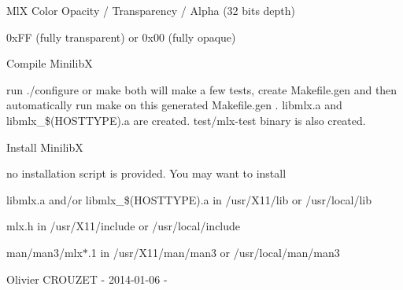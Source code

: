 \begin{DoxyCode}{0}

\end{DoxyCode}


MlX Color Opacity / Transparency / Alpha (32 bits depth)
\begin{DoxyItemize}
\item 0x\+FF (fully transparent) or 0x00 (fully opaque)
\end{DoxyItemize}

Compile MinilibX


\begin{DoxyItemize}
\item run ./configure or make both will make a few tests, create Makefile.\+gen and then automatically run make on this generated Makefile.\+gen . libmlx.\+a and libmlx\+\_\+\$(\+HOSTTYPE).a are created. test/mlx-\/test binary is also created.
\end{DoxyItemize}

Install MinilibX


\begin{DoxyItemize}
\item no installation script is provided. You may want to install
\begin{DoxyItemize}
\item libmlx.\+a and/or libmlx\+\_\+\$(\+HOSTTYPE).a in /usr/\+X11/lib or /usr/local/lib
\item mlx.\+h in /usr/\+X11/include or /usr/local/include
\item man/man3/mlx\texorpdfstring{$\ast$}{*}.1 in /usr/\+X11/man/man3 or /usr/local/man/man3
\end{DoxyItemize}
\end{DoxyItemize}

Olivier CROUZET -\/ 2014-\/01-\/06 -\/ 